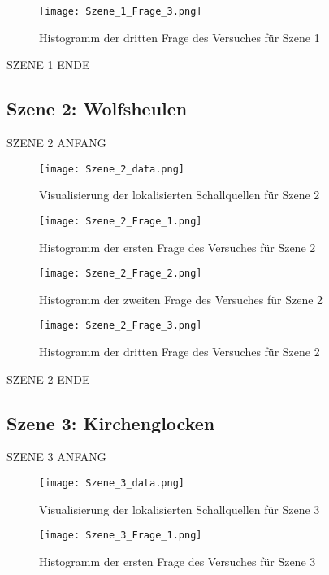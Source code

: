    \begin{figure}[H]
\centering
\texttt{[image: Szene\_1\_Frage\_3.png]}
\caption{Histogramm der dritten Frage des Versuches für Szene 1}
\label{fig:Szene_1_Frage3}
\end{figure} 

SZENE 1 ENDE

 \subsection{Szene 2: Wolfsheulen}
 SZENE 2 ANFANG
   \begin{figure}[H]
\centering
\texttt{[image: Szene\_2\_data.png]}
\caption{Visualisierung der lokalisierten Schallquellen für Szene 2}
\label{fig:Szene_2_data}
\end{figure} 

   \begin{figure}[H]
\centering
\texttt{[image: Szene\_2\_Frage\_1.png]}
\caption{Histogramm der ersten Frage des Versuches für Szene 2}
\label{fig:Szene_2_Frage1}
\end{figure} 

   \begin{figure}[H]
\centering
\texttt{[image: Szene\_2\_Frage\_2.png]}
\caption{Histogramm der zweiten Frage des Versuches für Szene 2}
\label{fig:Szene_2_Frage1}
\end{figure} 

   \begin{figure}[H]
\centering
\texttt{[image: Szene\_2\_Frage\_3.png]}
\caption{Histogramm der dritten Frage des Versuches für Szene 2}
\label{fig:Szene_2_Frage1}
\end{figure} 

SZENE 2 ENDE

 \subsection{Szene 3: Kirchenglocken}
 SZENE 3 ANFANG
   \begin{figure}[H]
\centering
\texttt{[image: Szene\_3\_data.png]}
\caption{Visualisierung der lokalisierten Schallquellen für Szene 3}
\label{fig:Szene_3_data}
\end{figure} 

   \begin{figure}[H]
\centering
\texttt{[image: Szene\_3\_Frage\_1.png]}
\caption{Histogramm der ersten Frage des Versuches für Szene 3}
\label{fig:Szene_1_Frage1}
\end{figure} 

